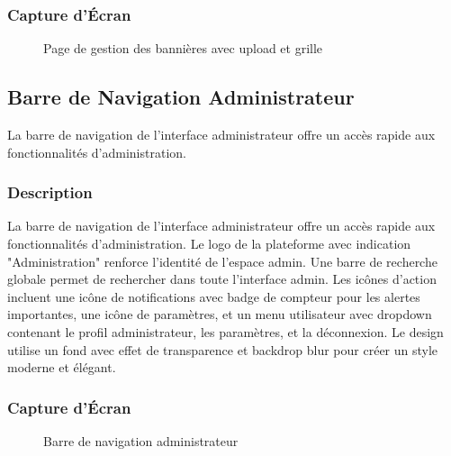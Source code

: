 \documentclass[12pt,a4paper]{article}
\begin{document}
\subsubsection{Capture d'Écran}

\begin{figure}[H]
    \centering
    \caption{Page de gestion des bannières avec upload et grille}
    \label{fig:admin-banners}
\end{figure}

\subsection{Barre de Navigation Administrateur}

La barre de navigation de l'interface administrateur offre un accès rapide aux fonctionnalités d'administration.

\subsubsection{Description}

La barre de navigation de l'interface administrateur offre un accès rapide aux fonctionnalités d'administration. Le logo de la plateforme avec indication "Administration" renforce l'identité de l'espace admin. Une barre de recherche globale permet de rechercher dans toute l'interface admin. Les icônes d'action incluent une icône de notifications avec badge de compteur pour les alertes importantes, une icône de paramètres, et un menu utilisateur avec dropdown contenant le profil administrateur, les paramètres, et la déconnexion. Le design utilise un fond avec effet de transparence et backdrop blur pour créer un style moderne et élégant.

\subsubsection{Capture d'Écran}

\begin{figure}[H]
    \centering
    \caption{Barre de navigation administrateur}
    \label{fig:admin-navbar}
\end{figure}
\end{document}
